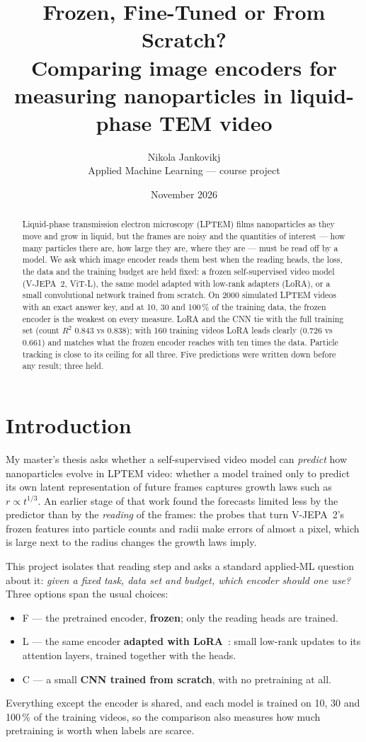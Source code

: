 \documentclass[11pt,a4paper]{article}
\title{Frozen, Fine-Tuned or From Scratch?\\[2pt]
\large Comparing image encoders for measuring nanoparticles in liquid-phase TEM video}
\author{Nikola Jankovikj\\ Applied Machine Learning --- course project}
\date{November 2026}
\newcommand{\F}{\textsf{F}}
\newcommand{\C}{\textsf{C}}
\newcommand{\Lo}{\textsf{L}}
\begin{document}
\maketitle

\begin{abstract}
Liquid-phase transmission electron microscopy (LPTEM) films nanoparticles as they move
and grow in liquid, but the frames are noisy and the quantities of interest --- how many
particles there are, how large they are, where they are --- must be read off by a
model. We ask which image encoder reads them best when the reading heads, the loss, the
data and the training budget are held fixed: a frozen self-supervised video model
(V-JEPA~2, ViT-L), the same model adapted with low-rank adapters (LoRA), or a small
convolutional network trained from scratch. On 2000 simulated LPTEM videos with an exact
answer key, and at 10, 30 and 100\,\% of the training data, the frozen encoder is the
weakest on every measure. LoRA and the CNN tie with the full training set (count
$R^2$ 0.843 vs 0.838); with 160 training videos LoRA leads clearly (0.726 vs 0.661)
and matches what the frozen encoder reaches with ten times the data. Particle tracking
is close to its ceiling for all three. Five predictions were written down before any
result; three held.
\end{abstract}

\section{Introduction}

My master's thesis asks whether a self-supervised video model can \emph{predict} how
nanoparticles evolve in LPTEM video: whether a model trained only to predict its own
latent representation of future frames captures growth laws such as $r \propto t^{1/3}$.
An earlier stage of that work found the forecasts limited less by the predictor than by
the \emph{reading} of the frames: the probes that turn V-JEPA~2's frozen features into
particle counts and radii make errors of almost a pixel, which is large next to the
radius changes the growth laws imply.

This project isolates that reading step and asks a standard applied-ML question about
it: \emph{given a fixed task, data set and budget, which encoder should one use?} Three
options span the usual choices:
\begin{itemize}
  \item \F{} --- the pretrained encoder, \textbf{frozen}; only the reading heads are trained.
  \item \Lo{} --- the same encoder \textbf{adapted with LoRA}~\cite{hu2022lora}: small
        low-rank updates to its attention layers, trained together with the heads.
  \item \C{} --- a small \textbf{CNN trained from scratch}, with no pretraining at all.
\end{itemize}
Everything except the encoder is shared, and each model is trained on 10, 30 and
100\,\% of the training videos, so the comparison also measures how much pretraining is
worth when labels are scarce.
\end{document}
